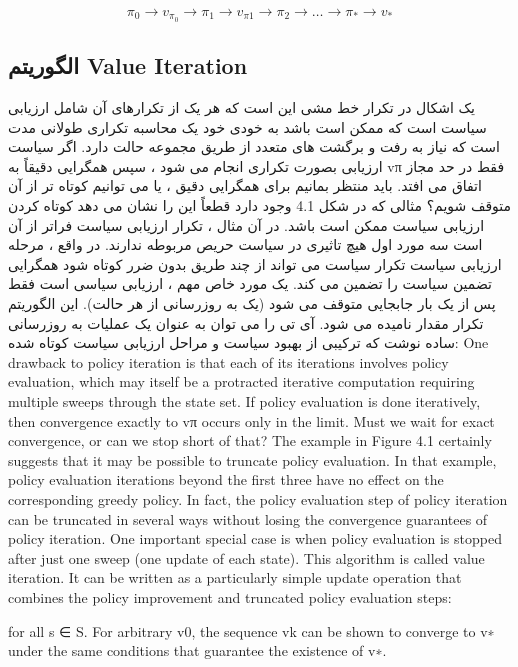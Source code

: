 $$\pi_0 \longrightarrow v_{\pi_0} \longrightarrow \pi_1 \longrightarrow v_{\pi{1}} \longrightarrow \pi_2 \longrightarrow \dots \longrightarrow \pi_* \longrightarrow v_*$$

\subsection{الگوریتم Value Iteration}
یک اشکال در تکرار خط مشی این است که هر یک از تکرارهای آن شامل ارزیابی سیاست است که ممکن است باشد
به خودی خود یک محاسبه تکراری طولانی مدت است که نیاز به رفت و برگشت های متعدد از طریق مجموعه حالت دارد. اگر سیاست
ارزیابی بصورت تکراری انجام می شود ، سپس همگرایی دقیقاً به vπ فقط در حد مجاز اتفاق می افتد. باید منتظر بمانیم
برای همگرایی دقیق ، یا می توانیم کوتاه تر از آن متوقف شویم؟ مثالی که در شکل 4.1 وجود دارد قطعاً این را نشان می دهد
کوتاه کردن ارزیابی سیاست ممکن است باشد. در آن مثال ، تکرار ارزیابی سیاست فراتر از آن است
سه مورد اول هیچ تاثیری در سیاست حریص مربوطه ندارند.
در واقع ، مرحله ارزیابی سیاست تکرار سیاست می تواند از چند طریق بدون ضرر کوتاه شود
همگرایی تضمین سیاست را تضمین می کند. یک مورد خاص مهم ، ارزیابی سیاسی است
فقط پس از یک بار جابجایی متوقف می شود (یک به روزرسانی از هر حالت). این الگوریتم تکرار مقدار نامیده می شود. آی تی
را می توان به عنوان یک عملیات به روزرسانی ساده نوشت که ترکیبی از بهبود سیاست و
مراحل ارزیابی سیاست کوتاه شده:
One drawback to policy iteration is that each of its iterations involves policy evaluation, which may
itself be a protracted iterative computation requiring multiple sweeps through the state set. If policy
evaluation is done iteratively, then convergence exactly to vπ occurs only in the limit. Must we wait
for exact convergence, or can we stop short of that? The example in Figure 4.1 certainly suggests that
it may be possible to truncate policy evaluation. In that example, policy evaluation iterations beyond
the first three have no effect on the corresponding greedy policy.
In fact, the policy evaluation step of policy iteration can be truncated in several ways without losing
the convergence guarantees of policy iteration. One important special case is when policy evaluation
is stopped after just one sweep (one update of each state). This algorithm is called value iteration. It
can be written as a particularly simple update operation that combines the policy improvement and
truncated policy evaluation steps:



for all s ∈ S. For arbitrary v0, the sequence {vk} can be shown to converge to v∗ under the same
conditions that guarantee the existence of v∗.

